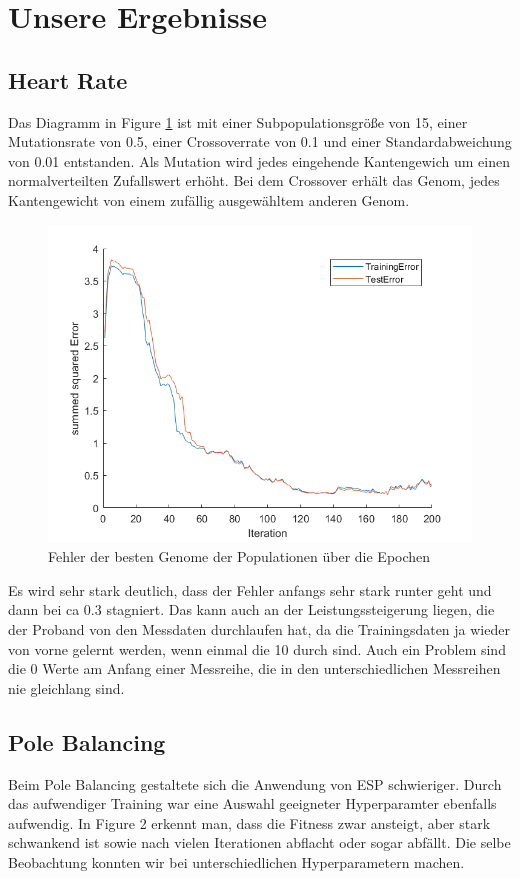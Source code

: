 \documentclass{hbrs-ecta-report}
\begin{document}
\section{Unsere Ergebnisse}

\subsection{Heart Rate}

Das Diagramm in Figure \ref{fig:Error} ist mit einer Subpopulationsgröße von 15, einer Mutationsrate von 0.5, einer Crossoverrate von 0.1 und einer Standardabweichung von 0.01 entstanden.
Als Mutation wird jedes eingehende Kantengewich um einen normalverteilten Zufallswert erhöht. 
Bei dem Crossover erhält das Genom, jedes Kantengewicht von einem zufällig ausgewähltem anderen Genom.

\begin{figure}[h!]
	\includegraphics[width=\linewidth]{img/TrainingTestError}
	\caption{Fehler der besten Genome der Populationen über die Epochen}
	\label{fig:Error}
\end{figure}
\FloatBarrier

Es wird sehr stark deutlich, dass der Fehler anfangs sehr stark runter geht und dann bei ca 0.3 stagniert. Das kann auch an der Leistungssteigerung liegen, die der Proband von den Messdaten durchlaufen hat, da die Trainingsdaten ja wieder von vorne gelernt werden, wenn einmal die 10 durch sind. Auch ein Problem sind die 0 Werte am Anfang einer Messreihe, die in den unterschiedlichen Messreihen nie gleichlang sind. 

\subsection{Pole Balancing} 
Beim Pole Balancing gestaltete sich die Anwendung von ESP schwieriger. Durch das aufwendiger Training war eine Auswahl geeigneter Hyperparamter ebenfalls aufwendig.
In Figure 2 erkennt man, dass die Fitness zwar ansteigt, aber stark schwankend ist sowie nach vielen Iterationen abflacht oder sogar abfällt. Die selbe Beobachtung konnten wir bei unterschiedlichen Hyperparametern machen.
\end{document}
